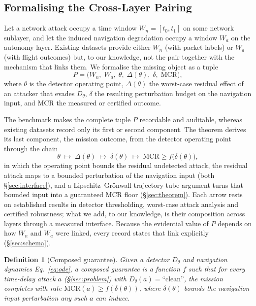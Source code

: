 \documentclass[conference,letterpaper,10pt]{IEEEtran}   %
\newcommand{\MCR}{\mathrm{MCR}}
\newtheorem{definition}{Definition}
\begin{document}
\subsection{Formalising the Cross-Layer Pairing}
\label{sec:formulation}
Let a network attack occupy a time window $W_n=[t_0,t_1]$ on some network
sublayer, and let the induced navigation degradation occupy a window $W_a$ on
the autonomy layer. Existing datasets provide either $W_n$ (with packet labels)
or $W_a$ (with flight outcomes) but, to our knowledge, not the pair together
with the mechanism that links them. We formalise the missing object as a tuple
\begin{equation}
\label{eq:pairing}
P = \big(W_n,\; W_a,\; \theta,\; \Delta(\theta),\; \delta,\; \MCR\big),
\end{equation}
where $\theta$ is the detector operating point, $\Delta(\theta)$ the worst-case
residual effect of an attacker that evades $D_\theta$, $\delta$ the resulting
perturbation budget on the navigation input, and MCR the measured or certified
outcome.

The benchmark makes the complete tuple $P$ recordable and auditable, whereas
existing datasets record only its first or second component. The theorem derives
its last component, the mission outcome, from the detector operating point
through the chain
\begin{equation}
\label{eq:chain}
\theta \;\longmapsto\; \Delta(\theta) \;\longmapsto\; \delta(\theta)
\;\longmapsto\; \MCR \ge f\big(\delta(\theta)\big),
\end{equation}
in which the operating point bounds the residual undetected attack, the
residual attack maps to a bounded perturbation of the navigation input (both
\S\ref{sec:interface}), and a Lipschitz--Gr\"onwall trajectory-tube argument
turns that bounded input into a guaranteed MCR floor (\S\ref{sec:theorem}). Each
arrow rests on established results in detector thresholding, worst-case attack
analysis and certified robustness; what we add, to our knowledge, is their
composition across layers through a measured interface.
Because the evidential value of $P$ depends on how $W_n$ and $W_a$ were linked,
every record states that link explicitly (\S\ref{sec:schema}).

\begin{definition}[Composed guarantee]
\label{def:composed}
Given a detector $D_\theta$ and navigation dynamics Eq.~\eqref{eq:ode}, a
\emph{composed guarantee} is a function $f$ such that for every time-delay attack
$a$ (\S\ref{sec:problem}) with $D_\theta(a)=\text{``clean''}$, the mission completes with rate
$\MCR(a)\ge f(\delta(\theta))$, where $\delta(\theta)$ bounds the
navigation-input perturbation any such $a$ can induce.
\end{definition}
\end{document}
